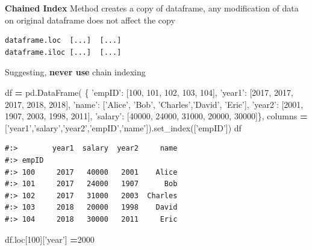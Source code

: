 \documentclass[
]{book}
\newenvironment{Shaded}{\begin{snugshade}}{\end{snugshade}}
\newcommand{\DecValTok}[1]{\textcolor[rgb]{0.06,0.06,0.06}{#1}}
\newcommand{\NormalTok}[1]{#1}
\newcommand{\OperatorTok}[1]{\textcolor[rgb]{0.43,0.43,0.43}{\textbf{#1}}}
\newcommand{\StringTok}[1]{\textcolor[rgb]{0.5,0.5,0.5}{#1}}
\begin{document}
\textbf{Chained Index} Method creates a copy of dataframe, any modification of data on original dataframe does not affect the copy

\begin{verbatim}
dataframe.loc  [...]  [...]
dataframe.iloc [...]  [...]
\end{verbatim}

Suggesting, \textbf{never use} chain indexing

\begin{Shaded}
\begin{Highlighting}[]
\NormalTok{df }\OperatorTok{=}\NormalTok{ pd.DataFrame(}
\NormalTok{    \{ }\StringTok{'empID'}\NormalTok{:  [}\DecValTok{100}\NormalTok{,      }\DecValTok{101}\NormalTok{,    }\DecValTok{102}\NormalTok{,      }\DecValTok{103}\NormalTok{,     }\DecValTok{104}\NormalTok{],}
      \StringTok{'year1'}\NormalTok{:   [}\DecValTok{2017}\NormalTok{,     }\DecValTok{2017}\NormalTok{,   }\DecValTok{2017}\NormalTok{,      }\DecValTok{2018}\NormalTok{,    }\DecValTok{2018}\NormalTok{],}
      \StringTok{'name'}\NormalTok{:   [}\StringTok{'Alice'}\NormalTok{,  }\StringTok{'Bob'}\NormalTok{,  }\StringTok{'Charles'}\NormalTok{,}\StringTok{'David'}\NormalTok{, }\StringTok{'Eric'}\NormalTok{],}
      \StringTok{'year2'}\NormalTok{:   [}\DecValTok{2001}\NormalTok{,     }\DecValTok{1907}\NormalTok{,   }\DecValTok{2003}\NormalTok{,      }\DecValTok{1998}\NormalTok{,    }\DecValTok{2011}\NormalTok{],}
      \StringTok{'salary'}\NormalTok{: [}\DecValTok{40000}\NormalTok{,    }\DecValTok{24000}\NormalTok{,  }\DecValTok{31000}\NormalTok{,     }\DecValTok{20000}\NormalTok{,   }\DecValTok{30000}\NormalTok{]\},}
\NormalTok{    columns }\OperatorTok{=}\NormalTok{ [}\StringTok{'year1'}\NormalTok{,}\StringTok{'salary'}\NormalTok{,}\StringTok{'year2'}\NormalTok{,}\StringTok{'empID'}\NormalTok{,}\StringTok{'name'}\NormalTok{]).set_index([}\StringTok{'empID'}\NormalTok{])}
\NormalTok{df}
\end{Highlighting}
\end{Shaded}

\begin{verbatim}
#:>        year1  salary  year2     name
#:> empID                               
#:> 100     2017   40000   2001    Alice
#:> 101     2017   24000   1907      Bob
#:> 102     2017   31000   2003  Charles
#:> 103     2018   20000   1998    David
#:> 104     2018   30000   2011     Eric
\end{verbatim}

\begin{Shaded}
\begin{Highlighting}[]
\NormalTok{df.loc[}\DecValTok{100}\NormalTok{][}\StringTok{'year'}\NormalTok{] }\OperatorTok{=}\DecValTok{2000}
\end{Highlighting}
\end{Shaded}
\end{document}
